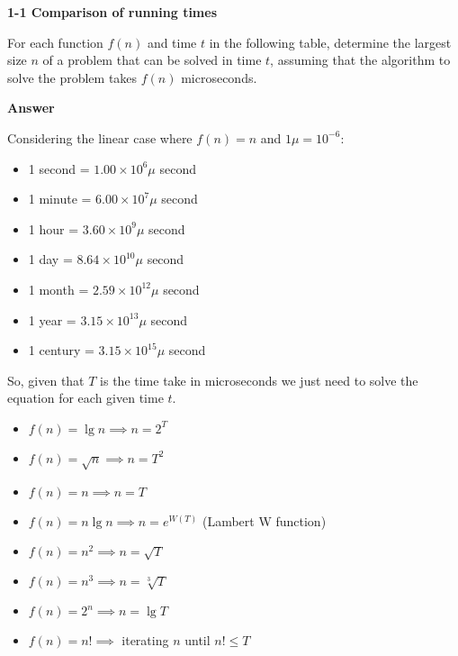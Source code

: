 \documentclass[11pt, oneside]{article}          %
\begin{document}

\textbf{1-1 Comparison of running times}

For each function $f(n)$ and time $t$ in the following table, determine the largest size $n$ of a problem that can be solved in time $t$, assuming that the algorithm to solve the problem takes $f(n)$ microseconds.

\textbf{Answer}

Considering the linear case where $f(n) = n$ and $1\mu = 10^{-6}$:

\begin{itemize}[label=,noitemsep]
  \item 1 second  = $1.00 \times 10^6\mu$ second
  \item 1 minute  = $6.00 \times 10^7\mu$ second
  \item 1 hour    = $3.60 \times 10^9\mu$ second
  \item 1 day     = $8.64 \times 10^{10}\mu$ second
  \item 1 month   = $2.59 \times 10^{12}\mu$ second
  \item 1 year    = $3.15 \times 10^{13}\mu$ second
  \item 1 century = $3.15 \times 10^{15}\mu$ second
\end{itemize}

So, given that $T$ is the time take in microseconds we just need to solve the equation for each given time $t$.

\begin{itemize}[label=,noitemsep]
  \item $f(n) = \lg n   \implies n = 2^{T}$
  \item $f(n) = \sqrt n \implies n = T^2$
  \item $f(n) = n       \implies n = T$
  \item $f(n) = n \lg n \implies n = e^{W(T)}$ (Lambert W function)
  \item $f(n) = n^2     \implies n = \sqrt T$
  \item $f(n) = n^3     \implies n = \sqrt[3] T$
  \item $f(n) = 2^n     \implies n = \lg T$
  \item $f(n) = n!      \implies $ iterating $n$ until $n! \leq T$
\end{itemize}
\end{document}
